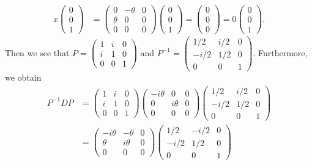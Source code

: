 \documentclass[a4paper]{article}
\begin{document}
\begin{solution}
\begin{align*}
    x \begin{pmatrix}  0 \\ 0 \\ 1  \end{pmatrix} &= \begin{pmatrix} 0 & - \theta & 0 \\ \theta & 0 & 0 \\ 0 & 0 & 0    \end{pmatrix} \begin{pmatrix}  0 \\ 0 \\ 1  \end{pmatrix}  = \begin{pmatrix}  0 \\ 0 \\ 0  \end{pmatrix}  = 0 \begin{pmatrix}  0 \\ 0 \\ 1  \end{pmatrix}.  
\end{align*}
Then we see that \( P = \displaystyle \begin{pmatrix} 1 &  i & 0 \\ i & 1 & 0 \\ 0 & 0 & 1  \end{pmatrix}  \) and  \( P^{-1} = \displaystyle \begin{pmatrix}  1/2 & i/2 & 0 \\ -i/2 & 1/2 & 0 \\ 0 & 0 & 1  \end{pmatrix}.   \)
Furthermore, we obtain
\begin{align*}
    P^{-1} D P &=  \begin{pmatrix} 1 &  i & 0 \\ i & 1 & 0 \\ 0 & 0 & 1  \end{pmatrix} \begin{pmatrix} - i \theta & 0 & 0 \\ 0 & i \theta & 0  \\ 0 & 0 & 0  \end{pmatrix} \begin{pmatrix}  1/2 & i/2 & 0 \\ -i/2 & 1/2 & 0 \\ 0 & 0 & 1  \end{pmatrix}   \\
               &= \begin{pmatrix} - i \theta & - \theta & 0 \\ \theta & i \theta & 0  \\ 0 & 0 & 0  \end{pmatrix}  \begin{pmatrix} 1/2 & -i/2 & 0 \\ - i /2 & 1/2 & 0 \\ 0 & 0 & 1  \end{pmatrix} \\

\end{align*}
\end{solution}
\end{document}
